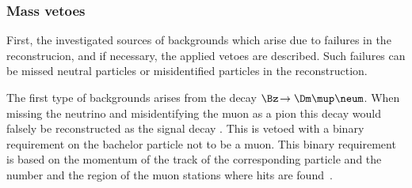 \subsubsection*{Mass vetoes}

First, the investigated sources of backgrounds which arise due to failures in the reconstrucion, and if necessary, the applied vetoes are described.
Such failures can be missed neutral particles or misidentified particles in the reconstruction.

The first type of backgrounds arises from the decay $\Bz\!\to\Dm\mup\neum$. When missing the neutrino and misidentifying the muon as a pion this decay would falsely be reconstructed as the signal decay \BdToDpi.
This is vetoed with a binary requirement on the bachelor particle not to be a muon.
This binary requirement is based on the momentum of the track of the corresponding particle and the number and the region of the muon stations where hits are found~\cite{Archilli:2013npa}.

